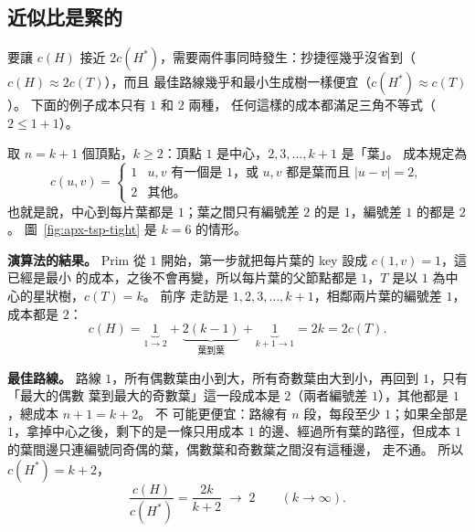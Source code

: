 \subsection{近似比是緊的}

要讓 $c(H)$ 接近 $2c(H^*)$，需要兩件事同時發生：抄捷徑幾乎沒省到（$c(H) \approx 2c(T)$），而且
最佳路線幾乎和最小生成樹一樣便宜（$c(H^*) \approx c(T)$）。 下面的例子成本只有 $1$ 和 $2$ 兩種，
任何這樣的成本都滿足三角不等式（$2 \le 1 + 1$）。

取 $n = k + 1$ 個頂點，$k \ge 2$：頂點 $1$ 是中心，$2, 3, \ldots, k + 1$ 是「葉」。 成本規定為
\[
c(u, v) =
\begin{cases}
1 & u, v \text{ 有一個是 } 1\text{，或 } u, v \text{ 都是葉而且 } |u - v| = 2, \\
2 & \text{其他。}
\end{cases}
\]
也就是說，中心到每片葉都是 $1$；葉之間只有編號差 $2$ 的是 $1$，編號差 $1$ 的都是 $2$。
圖~\ref{fig:apx-tsp-tight} 是 $k = 6$ 的情形。

\textbf{演算法的結果。} Prim 從 $1$ 開始，第一步就把每片葉的 key 設成 $c(1, v) = 1$，這已經是最小
的成本，之後不會再變，所以每片葉的父節點都是 $1$，$T$ 是以 $1$ 為中心的星狀樹，$c(T) = k$。 前序
走訪是 $1, 2, 3, \ldots, k + 1$，相鄰兩片葉的編號差 $1$，成本都是 $2$：
\[
c(H) = \underbrace{1}_{1 \to 2} + \underbrace{2(k - 1)}_{\text{葉到葉}} + \underbrace{1}_{k+1 \to 1}
= 2k = 2c(T).
\]

\textbf{最佳路線。} 路線 $1$，所有偶數葉由小到大，所有奇數葉由大到小，再回到 $1$，只有「最大的偶數
葉到最大的奇數葉」這一段成本是 $2$（兩者編號差 $1$），其他都是 $1$，總成本 $n + 1 = k + 2$。 不
可能更便宜：路線有 $n$ 段，每段至少 $1$；如果全部是 $1$，拿掉中心之後，剩下的是一條只用成本 $1$
的邊、經過所有葉的路徑，但成本 $1$ 的葉間邊只連編號同奇偶的葉，偶數葉和奇數葉之間沒有這種邊，
走不通。 所以 $c(H^*) = k + 2$，
\[
\frac{c(H)}{c(H^*)} = \frac{2k}{k + 2} \;\longrightarrow\; 2 \qquad (k \to \infty).
\]

